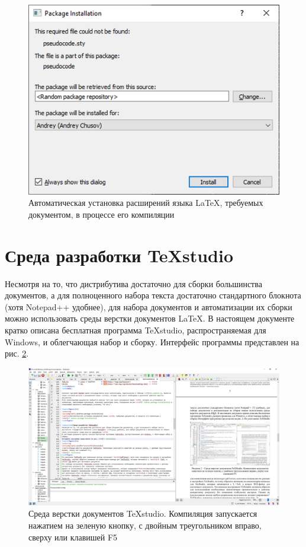 \documentclass[workbook, draught]{fefudoc}
\begin{document}
\begin{figure}[ht]
\centering
\includegraphics{workbook-extras/miktex-package-installation}
\caption{Автоматическая установка расширений языка \LaTeX, требуемых документом, в процессе его компиляции}
\label{автоустановка расширений miktex}
\end{figure}

\section{Среда разработки TeXstudio}\label{раздел про texstudio}
Несмотря на то, что дистрибутива достаточно для сборки большинства документов, а для полноценного набора текста достаточно стандартного блокнота (хотя Notepad++ \cite{npp} удобнее), для набора документов и автоматизации их сборки можно использовать среды верстки документов \LaTeX.
В настоящем документе кратко описана бесплатная программа TeXstudio, распространяемая для Windows, и облегчающая набор и сборку.
Интерфейс программы представлен на рис. \ref{скриншот texstudio}.
\begin{figure}[ht]
\centering
\includegraphics[width=\textwidth]{workbook-extras/texstudio}
\caption{Среда верстки документов TeXstudio. Компиляция запускается нажатием на зеленую кнопку, с двойным треугольником вправо, сверху или клавишей F5}
\label{скриншот texstudio}
\end{figure}
\end{document}
